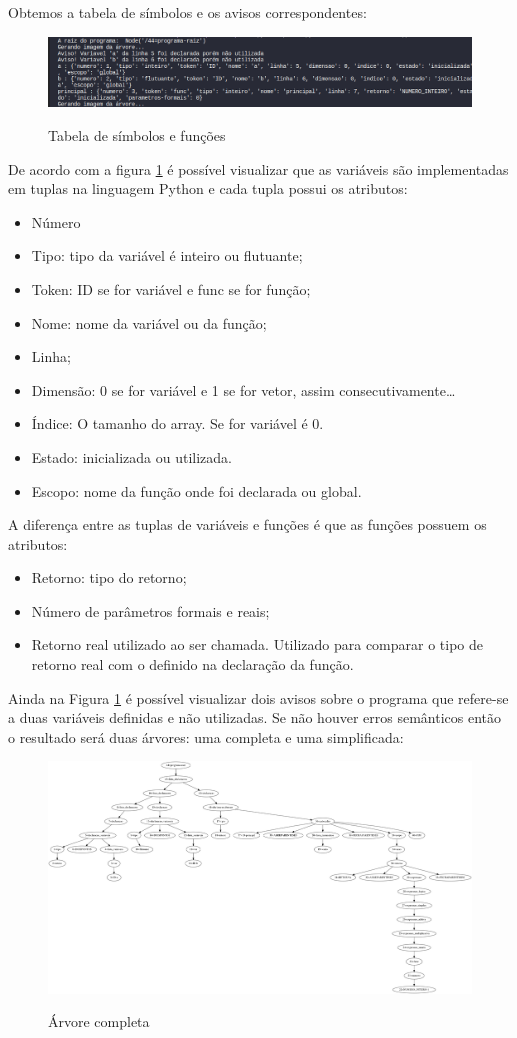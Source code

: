 \documentclass[12pt]{article}
\begin{document}
Obtemos a tabela de símbolos e os avisos correspondentes: 
\begin{figure}[H] 
	\centering  
	\caption{Tabela de símbolos e funções}
	\includegraphics[scale=0.4]{tableofsymbol.png} 
	\label{fig:table}
\end{figure} 
De acordo com a figura  
\ref{fig:table} é possível visualizar que as variáveis são implementadas em tuplas na linguagem Python e cada tupla possui os atributos: 
\begin{itemize}
	\item Número 
	\item Tipo: tipo da variável é inteiro ou flutuante; 
	\item Token: ID se for variável e func se for função; 
	\item Nome: nome da variável ou da função; 
	\item Linha; 
	\item Dimensão: 0 se for variável e 1 se for vetor, assim consecutivamente\ldots 
	\item Índice: O tamanho do array. Se for variável é 0. 
	\item Estado: inicializada ou utilizada. 
	\item Escopo: nome da função onde foi declarada ou global.
\end{itemize} 
A diferença entre as tuplas de variáveis e funções é que as funções possuem os atributos: 
\begin{itemize}
	\item Retorno: tipo do retorno; 
	\item Número de parâmetros formais e reais;  
	\item Retorno real utilizado ao ser chamada. Utilizado para comparar o tipo de retorno real com o definido na declaração da função.
\end{itemize} 
Ainda na Figura \ref{fig:table} é possível visualizar dois avisos sobre o programa que refere-se a duas variáveis definidas e não utilizadas.  
Se não houver erros semânticos então o resultado será duas árvores: uma completa e uma simplificada: 
\begin{figure}[H]  
	\centering  
	\caption{Árvore completa}
	\includegraphics[width=\textwidth]{arvore-sintatica1} 
	\label{fig:arvorecompleta}
\end{figure}
\end{document}
